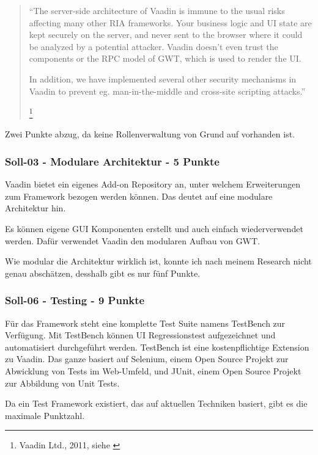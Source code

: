   \begin{quote}
  \begin{itshape}``The server-side architecture of Vaadin is immune to the usual
  risks affecting many other RIA frameworks. Your business logic and UI state
  are kept securely on the server, and never sent to the browser where it could
  be analyzed by a potential attacker. Vaadin doesn't even trust the components
  or the RPC model of GWT, which is used to render the UI.

  In addition, we have implemented several other security mechanisms in Vaadin
  to prevent eg. man-in-the-middle and cross-site scripting
  attacks.''\end{itshape}
  \footnote{Vaadin Ltd., 2011, siehe \cite{VaadinSecurityAlerts}}
  \end{quote}
  
  Zwei Punkte abzug, da keine Rollenverwaltung von Grund auf vorhanden ist.
  
  \subsubsection{Soll-03 - Modulare Architektur - 5 Punkte}
  
  Vaadin bietet ein eigenes Add-on Repository an, unter welchem Erweiterungen
  zum Framework bezogen werden können. Das deutet auf eine modulare Architektur
  hin.
  
  Es können eigene \ac{GUI} Komponenten erstellt und auch einfach
  wiederverwendet werden. Dafür verwendet Vaadin den modularen Aufbau von
  \ac{GWT}.
  
  Wie modular die Architektur wirklich ist, konnte ich nach meinem Research
  nicht genau abschätzen, desshalb gibt es nur fünf Punkte.
  
  \subsubsection{Soll-06 - Testing - 9 Punkte}
  
  Für das Framework steht eine komplette Test Suite namens TestBench zur
  Verfügung. Mit TestBench können UI Regressionstest aufgezeichnet und
  automatisiert durchgeführt werden. TestBench ist eine kostenpflichtige
  Extension zu Vaadin. Das ganze basiert auf Selenium, einem Open Source
  Projekt zur Abwicklung von Tests im Web-Umfeld, und JUnit, einem Open Source
  Projekt zur Abbildung von Unit Tests.
  
  Da ein Test Framework existiert, das auf aktuellen Techniken basiert, gibt es
  die maximale Punktzahl.
  
